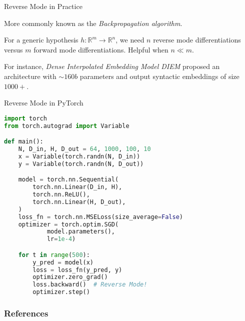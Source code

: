 \documentclass{beamer}
\begin{document}
\begin{frame}{Reverse Mode in Practice}

More commonly known as the \textit{Backpropagation algorithm}.

For a generic hypothesis $h: \mathbb{R}^m \to \mathbb{R}^n$, we need $n$
reverse mode differentiations versus $m$ forward mode differentiations.
Helpful when $n \ll m$.

For instance, \textit{Dense Interpolated Embedding Model DIEM} \cite{Trask2015}
proposed an architecture with $\sim 160b$ parameters and output syntactic embeddings
of size $1000+$.

\end{frame}

\begin{frame}{Reverse Mode in PyTorch}

\begin{lstlisting}[language=Python]
import torch
from torch.autograd import Variable

def main():
    N, D_in, H, D_out = 64, 1000, 100, 10
    x = Variable(torch.randn(N, D_in))
    y = Variable(torch.randn(N, D_out))

    model = torch.nn.Sequential(
        torch.nn.Linear(D_in, H),
        torch.nn.ReLU(),
        torch.nn.Linear(H, D_out),
    )
    loss_fn = torch.nn.MSELoss(size_average=False)
    optimizer = torch.optim.SGD(
    		model.parameters(),
    		lr=1e-4)

    for t in range(500):
        y_pred = model(x)
        loss = loss_fn(y_pred, y)
        optimizer.zero_grad()
        loss.backward()  # Reverse Mode!
        optimizer.step()
\end{lstlisting}

\end{frame}

\begin{frame}[allowframebreaks]

\nocite{DBLP:journals/corr/BaydinPR15}
\nocite{Griewank2008}

\frametitle{References}


\end{frame}
\end{document}
